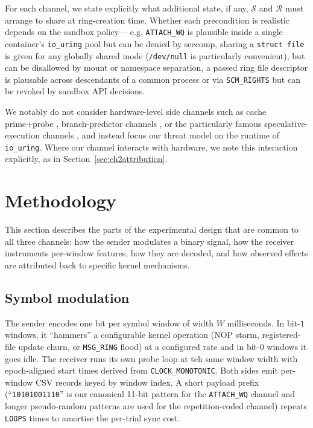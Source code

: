 \documentclass[letterpaper,twocolumn,10pt]{article}
\newcommand{\code}[1]{\texttt{#1}}
\newcommand{\iouring}{\texttt{io\_uring}\xspace}
\newcommand{\s}{\ensuremath{\mathcal{S}}\xspace}
\renewcommand{\r}{\ensuremath{\mathcal{R}}\xspace}
\begin{document}
For each channel, we state explicitly what additional state, if any, \s and \r must arrange to share at ring-creation time. Whether each precondition is realistic depends on the sandbox policy--- e.g. \code{ATTACH\_WQ} is plausible inside a single container's \iouring pool but can be denied by seccomp, sharing a \code{struct file} is given for any globally shared inode (\code{/dev/null} is particularly convenient), but can be disallowed by mount or namespace separation, a passed ring file descriptor is plausable across descendants of a common process or via \code{SCM\_RIGHTS} but can be revoked by sandbox API decisions.

We notably do not consider hardware-level side channels such as cache prime+probe \cite{percival2005cache, yarom2014flushreload,liu2015lastlevel}, branch-predictor channels \cite{evtyushkin2018branchscope}, or the particularly famous speculative-execution channels \cite{kocher2019spectre, lipp2018meltdown}, and instead focus our threat model on the runtime of \iouring. Where our channel interacts with hardware, we note this interaction explicitly, as in Section~\ref{sec:ch2attribution}. %

\section{Methodology}
This section describes the parts of the experimental design that are common to all three channels: how the sender modulates a binary signal, how the receiver instruments per-window features, how they are decoded, and how observed effects are attributed back to specific kernel mechanisms.

\subsection{Symbol modulation}
The sender encodes one bit per symbol window of width $W$ milliseconds. In bit-$1$ windows, it ``hammers'' a configurable kernel operation (NOP storm, registered-file update churn, or \code{MSG\_RING} flood) at a configured rate and in bit-0 windows it goes idle. The receiver runs its own probe loop at teh same window width with epoch-aligned start times derived from \code{CLOCK\_MONOTONIC}. Both sides emit per-window CSV records keyed by window index. A short payload prefix (``\code{10101001110}'' is our canonical 11-bit pattern for the \code{ATTACH\_WQ} channel and longer pseudo-random patterns are used for the repetition-coded channel) repeats \code{LOOPS} times to amortise the per-trial sync cost.
\end{document}
